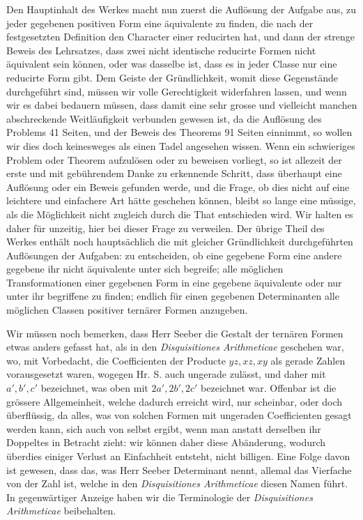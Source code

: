 \documentclass[12pt]{article}
\begin{document}
Den Hauptinhalt des Werkes macht nun zuerst die Auflösung der Aufgabe aus, zu jeder gegebenen positiven Form eine äquivalente zu finden, die nach der festgesetzten Definition den Character einer reducirten hat, und dann der strenge Beweis des Lehrsatzes, dass zwei nicht identische reducirte Formen nicht äquivalent sein können, oder was dasselbe ist, dass es in jeder Classe nur eine reducirte Form gibt. Dem Geiste der Gründlichkeit, womit diese Gegenstände durchgeführt sind, müssen wir volle Gerechtigkeit widerfahren lassen, und wenn wir es dabei bedauern müssen, dass damit eine sehr grosse und vielleicht manchen abschreckende Weitläufigkeit verbunden gewesen ist, da die Auflösung des Problems 41 Seiten, und der Beweis des Theorems 91 Seiten einnimmt, so wollen wir dies doch keinesweges als einen Tadel angesehen wissen. Wenn ein schwieriges Problem oder Theorem aufzulösen oder zu beweisen vorliegt, so ist allezeit der erste und mit gebührendem Danke zu erkennende Schritt, dass überhaupt eine Auflösung oder ein Beweis gefunden werde, und die Frage, ob dies nicht auf eine leichtere und einfachere Art hätte geschehen können, bleibt so lange eine müssige, als die Möglichkeit nicht zugleich durch die That entschieden wird. Wir halten es daher für unzeitig, hier bei dieser Frage zu verweilen. Der übrige Theil des Werkes enthält noch hauptsächlich die mit gleicher Gründlichkeit durchgeführten Auflösungen der Aufgaben: zu entscheiden, ob eine gegebene Form eine andere gegebene ihr nicht äquivalente unter sich begreife; alle möglichen Transformationen einer gegebenen Form in eine gegebene äquivalente oder nur unter ihr begriffene zu finden; endlich für einen gegebenen Determinanten alle möglichen Classen positiver ternärer Formen anzugeben.

Wir müssen noch bemerken, dass Herr Seeber die Gestalt der ternären Formen etwas anders gefasst hat, als in den \textit{Disquisitiones Arithmeticae} geschehen war, wo, mit Vorbedacht, die Coefficienten der Producte $yz,xz,xy$ als gerade Zahlen vorausgesetzt waren, wogegen Hr. S. auch ungerade zulässt, und daher mit $a',b',c'$ bezeichnet, was oben mit $2a',2b',2c'$ bezeichnet war. Offenbar ist die grössere Allgemeinheit, welche dadurch erreicht wird, nur scheinbar, oder doch überflüssig, da alles, was von solchen Formen mit ungeraden Coefficienten gesagt werden kann, sich auch von selbst ergibt, wenn man anstatt derselben ihr Doppeltes in Betracht zieht: wir können daher diese Abänderung, wodurch überdies einiger Verlust an Einfachheit entsteht, nicht billigen. Eine Folge davon ist gewesen, dass das, was Herr Seeber Determinant nennt, allemal das Vierfache von der Zahl ist, welche in den \textit{Disquisitiones Arithmeticae} diesen Namen führt. In gegenwärtiger Anzeige haben wir die Terminologie der \textit{Disquisitiones Arithmeticae} beibehalten.
\end{document}
